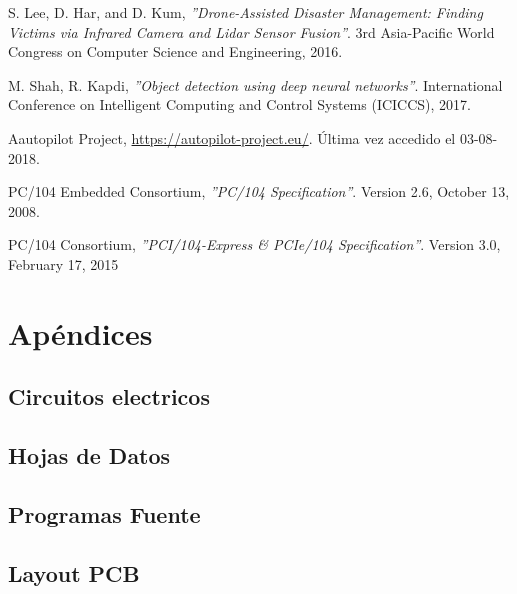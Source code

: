 \documentclass[a4paper,10pt]{article}
\begin{document}
\begin{thebibliography}{9}
    S. Lee, D. Har, and D. Kum,
    \textit{''Drone-Assisted Disaster Management: Finding Victims via Infrared Camera and Lidar Sensor Fusion''}.
    3rd Asia-Pacific World Congress on Computer Science and Engineering, 
    2016.

    M. Shah, R. Kapdi,
    \textit{''Object detection using deep neural networks''}.
     International Conference on Intelligent Computing and Control Systems (ICICCS),
     2017.
     
    Aautopilot Project,
    \url{https://autopilot-project.eu/}.
    Última vez accedido el 03-08-2018.

    PC/104 Embedded Consortium,
    \textit{''PC/104 Specification''}.
    Version 2.6,
    October 13, 2008.

    PC/104 Consortium,
    \textit{''PCI/104-Express \& PCIe/104 Specification''}.
    Version 3.0,
    February 17, 2015
    
\end{thebibliography}


\newpage
\section{Apéndices}
\label{sec:8_apendix}

\subsection{Circuitos electricos}
\label{sec:9_circ}

\subsection{Hojas de Datos}
\label{sec:10_hd}

\subsection{Programas Fuente}
\label{sec:11_soft}

\subsection{Layout PCB}
\label{sec:12_pcblay}
\end{document}
